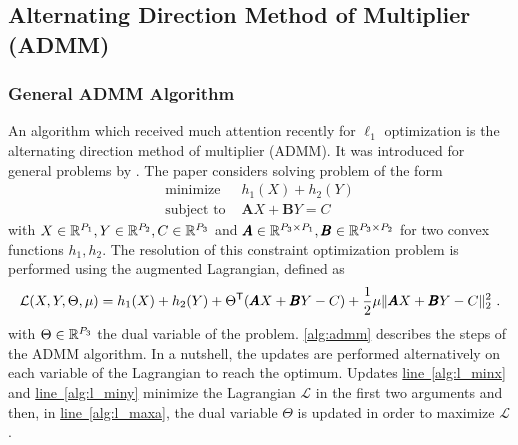 \documentclass[../thesis.tex]{subfiles}
\begin{document}
\subsection{Alternating Direction Method of Multiplier (ADMM)}
\label{sub:admm}


\subsubsection{General ADMM Algorithm}
\label{ssub:admm_general}

	An algorithm which received much attention recently for $\ell_1$ optimization
	is the alternating direction method of multiplier (ADMM). It was introduced for
	general problems by \cite{Gabay1976}. The paper considers solving problem of
	the form 
	\begin{equation}
		\label{eq:admm_general}
		\begin{split}
			\text{minimize~} & h_1(X) + h_2(Y)\\
			\text{subject to~} & \pmb AX + \pmb BY = C
		\end{split}
	\end{equation}
	with $X \in {\mathbb{R}}^{P_1}, Y\in{\mathbb{R}}^{P_2}, C\in{\mathbb{R}}^{P_3}$ and
	$\pmb A \in{\mathbb{R}}^{P_3\times P_1}, \pmb B \in{\mathbb{R}}^{P_3\times P_2}$ for two
	convex functions $h_1, h_2$. The resolution of this constraint optimization
	problem is performed using the augmented Lagrangian, defined as
	\begin{equation}
	\label{eq:lagrangien}
		\mathcal L(X, Y, \Theta, \mu) = h_1(X) + h_2(Y)
			+ \Theta^\mathsf{T}(\pmb AX + \pmb BY - C)
			+ \frac{1}{2}\mu \|\pmb AX + \pmb BY - C\|_2^2~.
	\end{equation}
with $\Theta \in {\mathbb{R}}^{P_3}$ the dual variable of the problem. \autoref{alg:admm} describes the steps of the ADMM algorithm. In a nutshell, the updates are performed alternatively on each variable of the Lagrangian to reach the optimum. Updates  \hyperref[alg:l_minx]{line~\ref*{alg:l_minx}} and \hyperref[alg:l_miny]{line~\ref*{alg:l_miny}} minimize the Lagrangian $\mathcal L$ in the first two arguments and then, in \hyperref[alg:l_maxa]{line~\ref*{alg:l_maxa}}, the dual variable $\Theta$ is updated in order to maximize $\mathcal L$.
\end{document}
